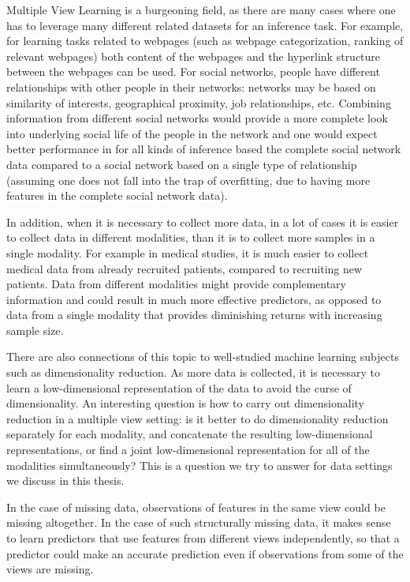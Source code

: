 \documentclass[12pt,oneside,final]{thesis}
\begin{document}
 Multiple View Learning is a burgeoning field, as there are many cases where one has to leverage many different related datasets for an inference task. For example, for learning  tasks related to webpages (such as webpage categorization, ranking of relevant webpages) both content of the webpages and the hyperlink structure between the webpages can be used. For social networks, people have different relationships with other people in their networks: networks  may be based on similarity of interests, geographical proximity, job relationships, etc. Combining information from different social networks would provide a more complete look into underlying social life of the people in the network and one would expect better performance in for all kinds of  inference based the complete social network data compared to a social network based on a single type of relationship (assuming one does not fall into the trap of overfitting, due to having more features in the complete social network data).

In addition, when it is necessary to collect more data, in a lot of cases it is easier to collect data in different modalities, than it is to collect more samples in a single modality. For example in medical studies, it is much easier to  collect medical data from already recruited patients, compared to recruiting new patients. Data from different modalities might provide complementary information and could result in much more effective predictors, as opposed to data from a single modality that provides diminishing returns with increasing sample size.

There are  also connections of this topic to well-studied machine learning subjects such as dimensionality reduction. As more data is collected, it is necessary to learn a low-dimensional representation of the data to avoid the curse of dimensionality. An interesting question is how to carry out dimensionality reduction in a multiple view setting: is it better to do dimensionality reduction separately for each modality, and concatenate the resulting low-dimensional representations, or find a joint low-dimensional representation  for all of the modalities simultaneously? This is a question we try to answer for data settings we discuss in this thesis.

In the case of missing data, observations of features in the same view could  be missing altogether. In the case of such structurally missing data, it makes sense to learn predictors that use features from different views independently, so that a predictor could make an accurate prediction even if observations from some of the views are missing.
\end{document}
